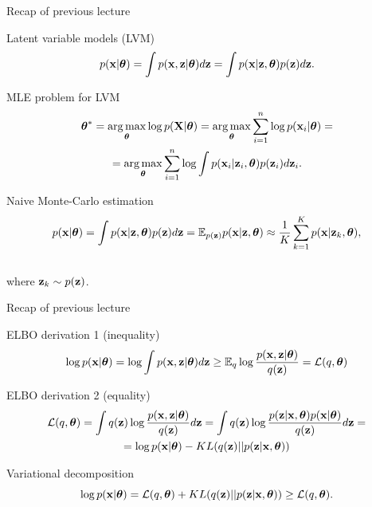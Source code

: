 \begin{frame}{Recap of previous lecture}
	\begin{block}{Latent variable models (LVM)}
		\vspace{-0.3cm}
		\[
		p(\mathbf{x} | \boldsymbol{\theta}) = \int p(\mathbf{x}, \mathbf{z} | \boldsymbol{\theta}) d\mathbf{z} = \int p(\mathbf{x} | \mathbf{z}, \boldsymbol{\theta}) p(\mathbf{z}) d\mathbf{z}.
		\]
	\end{block}
	\begin{block}{MLE problem for LVM}
		\vspace{-0.7cm}
		\begin{multline*}
			\boldsymbol{\theta}^* = \operatorname*{arg\,max}_{\boldsymbol{\theta}} \log p(\mathbf{X}| \boldsymbol{\theta}) = \operatorname*{arg\,max}_{\boldsymbol{\theta}} \sum_{i=1}^n \log p(\mathbf{x}_i | \boldsymbol{\theta}) = \\ = \operatorname*{arg\,max}_{\boldsymbol{\theta}}  \sum_{i=1}^n \log \int p(\mathbf{x}_i| \mathbf{z}_i, \boldsymbol{\theta}) p(\mathbf{z}_i) d\mathbf{z}_i.
		\end{multline*}
		\vspace{-0.7cm}
	\end{block}
	\begin{block}{Naive Monte-Carlo estimation}
		\vspace{-0.7cm}
		\[
		p(\mathbf{x} | \boldsymbol{\theta}) = \int p(\mathbf{x} | \mathbf{z}, \boldsymbol{\theta}) p(\mathbf{z}) d\mathbf{z} = \mathbb{E}_{p(\mathbf{z})} p(\mathbf{x} | \mathbf{z}, \boldsymbol{\theta}) \approx \frac{1}{K} \sum_{k=1}^{K} p(\mathbf{x} | \mathbf{z}_k, \boldsymbol{\theta}),
		\]
		\vspace{-0.5cm} \\
		where $\mathbf{z}_k \sim p(\mathbf{z})$. 
	\end{block}
\end{frame}
\begin{frame}{Recap of previous lecture}
	\begin{block}{ELBO derivation 1 (inequality)}
		\vspace{-0.3cm}
		\begin{multline*}
			\log p(\mathbf{x}| \boldsymbol{\theta}) 
			= \log \int p(\mathbf{x}, \mathbf{z} | \boldsymbol{\theta}) d\mathbf{z} \geq \mathbb{E}_{q} \log \frac{p(\mathbf{x}, \mathbf{z}| \boldsymbol{\theta})}{q(\mathbf{z})} =  \mathcal{L}(q, \boldsymbol{\theta})
		\end{multline*}
		\vspace{-0.3cm}
	\end{block}
	\begin{block}{ELBO derivation 2 (equality)}
		\vspace{-0.3cm}
		\begin{multline*}
			\mathcal{L} (q, \boldsymbol{\theta}) = \int q(\mathbf{z}) \log \frac{p(\mathbf{x}, \mathbf{z} | \boldsymbol{\theta})}{q(\mathbf{z})}d\mathbf{z} = 
			\int q(\mathbf{z}) \log \frac{p(\mathbf{z}|\mathbf{x}, \boldsymbol{\theta})p(\mathbf{x}| \boldsymbol{\theta})}{q(\mathbf{z})}d\mathbf{z} = \\
			= \log p(\mathbf{x}| \boldsymbol{\theta}) - KL(q(\mathbf{z}) || p(\mathbf{z}|\mathbf{x}, \boldsymbol{\theta}))
		\end{multline*}
	\end{block}
	\vspace{-0.3cm}
	\begin{block}{Variational decomposition}
		\[
		\log p(\mathbf{x}| \boldsymbol{\theta}) = \mathcal{L} (q, \boldsymbol{\theta}) + KL(q(\mathbf{z}) || p(\mathbf{z}|\mathbf{x}, \boldsymbol{\theta})) \geq \mathcal{L} (q, \boldsymbol{\theta}).
		\]
	\end{block}
\end{frame}
